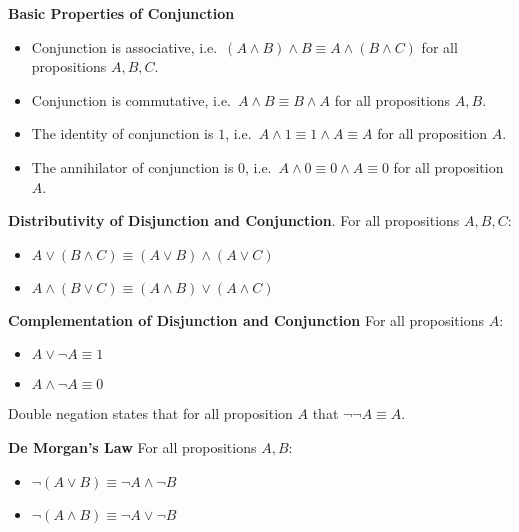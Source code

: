 \bigskip
\begin{proposition}
    \textbf{Basic Properties of Conjunction}
    \begin{itemize}
        \item Conjunction is associative, i.e.\ \((A\land B)\land B\equiv A\land(B\land C)\) for all propositions \(A,B,C\).
        \item Conjunction is commutative, i.e.\ \(A\land B\equiv B\land A\)  for all propositions \(A,B\).
        \item The identity of conjunction is \(1\), i.e.\ \(A\land1\equiv 1\land A\equiv A\) for all proposition \(A\).
        \item The annihilator of conjunction is \(0\), i.e.\ \(A\land0\equiv 0\land A\equiv 0\) for all proposition \(A\).
    \end{itemize}
\end{proposition}

\bigskip
\begin{proposition}
    \textbf{Distributivity of Disjunction and Conjunction}. 
    \newline For all propositions \(A,B,C\):
    \begin{itemize}
        \item \(A\lor(B\land C)\equiv (A\lor B)\land(A\lor C)\)
        \item\(A\land(B\lor C)\equiv (A\land B)\lor(A\land C)\)
    \end{itemize}
\end{proposition}

\bigskip
\begin{proposition}
    \textbf{Complementation of Disjunction and Conjunction}
    \newline For all propositions \(A\):
    \begin{itemize}
        \item \(A\lor\lnot A\equiv 1\)
        \item \(A\land\lnot A\equiv 0\)
    \end{itemize}
\end{proposition}

\bigskip
\begin{proposition}
    Double negation states that for all proposition \(A\) that \(\lnot\lnot A\equiv A\).
\end{proposition}

\bigskip
\begin{proposition}
    \textbf{De Morgan's Law}
    \newline For all propositions \(A,B\):
    \begin{itemize}
        \item \(\lnot(A\lor B)\equiv\lnot A\land\lnot B\)
        \item \(\lnot(A\land B)\equiv\lnot A\lor\lnot B\)
    \end{itemize}
\end{proposition}

